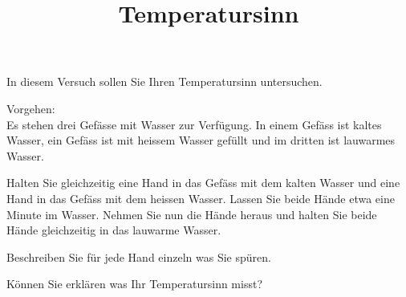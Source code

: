 \documentclass[12pt,a5paper, twosite]{article}
\author{}
\date{}
\title{Temperatursinn}
\begin{document}
\maketitle

In diesem Versuch sollen Sie Ihren Temperatursinn untersuchen.

Vorgehen:\\
Es stehen drei Gefässe mit Wasser zur Verfügung. 
In einem Gefäss ist kaltes Wasser, ein Gefäss ist mit heissem Wasser gefüllt und im dritten ist lauwarmes Wasser.

Halten Sie gleichzeitig eine Hand in das Gefäss mit dem kalten Wasser und eine Hand in das Gefäss mit dem heissen Wasser.
Lassen Sie beide Hände etwa eine Minute im Wasser.
Nehmen Sie nun die Hände heraus und halten Sie beide Hände gleichzeitig in das lauwarme Wasser.

\begin{aufgabe}
	Beschreiben Sie für jede Hand einzeln was Sie spüren.

	Können Sie erklären was Ihr Temperatursinn misst?
\end{aufgabe}
\end{document}
